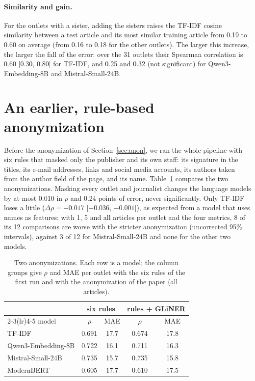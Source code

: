 \documentclass[11pt,a4paper]{article}
\begin{document}
\paragraph{Similarity and gain.} For the outlets with a sister, adding the sisters raises the TF-IDF cosine similarity
between a test article and its most similar training article from 0.19 to 0.60 on average (from 0.16 to 0.18 for the
other outlets). The larger this increase, the larger the fall of the error: over the 31 outlets their Spearman
correlation is 0.60 [0.30, 0.80] for TF-IDF, and 0.25 and 0.32 (not significant) for Qwen3-Embedding-8B and
Mistral-Small-24B.

\section{An earlier, rule-based anonymization}\label{app:anon}
Before the anonymization of Section~\ref{sec:anon}, we ran the whole pipeline with six rules that masked only the
publisher and its own staff: its signature in the titles, its e-mail addresses, links and social media accounts, its
authors taken from the author field of the page, and its name. Table~\ref{tab:anon} compares the two anonymizations.
Masking every outlet and journalist changes the language models by at most 0.010 in $\rho$ and 0.24 points of error,
never significantly. Only TF-IDF loses a little ($\Delta\rho = -0.017$ [$-0.036$, $-0.001$]), as expected from a model
that uses names as features: with 1, 5 and all articles per outlet and the four metrics, 8 of its 12 comparisons are
worse with the stricter anonymization (uncorrected 95\% intervals), against 3 of 12 for Mistral-Small-24B and none for
the other two models.

\begin{table}[h]
\centering
\caption{Two anonymizations. Each row is a model; the column groups give $\rho$ and MAE per outlet with the six rules of
the first run and with the anonymization of the paper (all articles).}\label{tab:anon}
\begin{tabular}{lcccc}
\toprule
& \multicolumn{2}{c}{six rules} & \multicolumn{2}{c}{rules + GLiNER} \\
\cmidrule(lr){2-3}\cmidrule(lr){4-5}
model & $\rho$ & MAE & $\rho$ & MAE \\
\midrule
TF-IDF & 0.691 & 17.7 & 0.674 & 17.8 \\
Qwen3-Embedding-8B & 0.722 & 16.1 & 0.711 & 16.3 \\
Mistral-Small-24B & 0.735 & 15.7 & 0.735 & 15.8 \\
ModernBERT & 0.605 & 17.7 & 0.610 & 17.5 \\
\bottomrule
\end{tabular}
\end{table}
\end{document}
